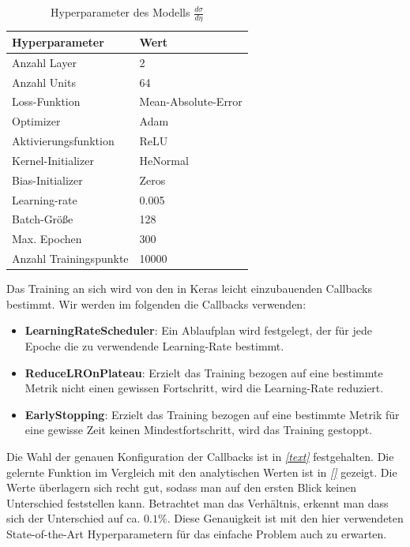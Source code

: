 \begin{table}[hbt]
	\centering
	\begin{tabular}{|l|l|}
		\hline
		Hyperparameter & Wert \\
		\hline
		Anzahl Layer & 2 \\
		Anzahl Units & 64 \\
		Loss-Funktion & Mean-Absolute-Error \\
		Optimizer & Adam \\
		Aktivierungsfunktion & ReLU \\
		Kernel-Initializer & HeNormal \\
		Bias-Initializer & Zeros \\
		Learning-rate & 0.005 \\
		Batch-Größe & 128 \\
		Max. Epochen & 300 \\
		Anzahl Trainingspunkte & 10000\\
		\hline
	\end{tabular}
	\caption{Hyperparameter des Modells $\frac{d\sigma}{d\eta}$}
\end{table}
Das Training an sich wird von den in Keras leicht einzubauenden Callbacks bestimmt. Wir werden im folgenden die Callbacks verwenden:
\begin{itemize}
	\item \textbf{LearningRateScheduler}: Ein Ablaufplan wird festgelegt, der für jede Epoche die zu verwendende Learning-Rate bestimmt. 
	\item \textbf{ReduceLROnPlateau}: Erzielt das Training bezogen auf eine bestimmte Metrik nicht einen gewissen Fortschritt, wird die Learning-Rate reduziert.
	\item \textbf{EarlyStopping}: Erzielt das Training bezogen auf eine bestimmte Metrik für eine gewisse Zeit keinen Mindestfortschritt, wird das Training gestoppt.
\end{itemize}
Die Wahl der genauen Konfiguration der Callbacks ist in \textit{\autoref{text}} festgehalten.
Die gelernte Funktion im Vergleich mit den analytischen Werten ist in \textit{\autoref{}} gezeigt. Die Werte überlagern sich recht gut, sodass man auf den ersten Blick keinen Unterschied feststellen kann. Betrachtet man das Verhältnis, erkennt man dass sich der Unterschied auf ca. $0.1\%$. Diese Genauigkeit ist mit den hier verwendeten State-of-the-Art Hyperparametern für das einfache Problem auch zu erwarten.
